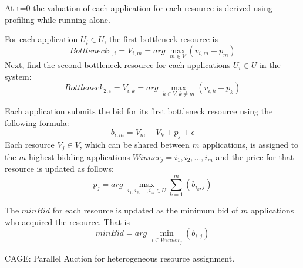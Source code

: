 \begin{comment}
Diffrentiating with respect to $b_1$ the optimal bid for application one is derived as follows:



\begin{equation}
\frac{\partial}{\partial b_1} ( {(\frac{n-m+1}{n-m} b_1) }^{n-m} (v_1 -b_1))=0.
\end{equation}

Which gives us the optimal bid for each application:
\begin{equation}
\Rightarrow b_1= \frac{n-m}{n-m+1}v_1
\end{equation}
\end{proof}
\end{comment}
\begin{algorithm}[!tb]
\DontPrintSemicolon %
At t=0 the valuation of each application for each resource is derived using profiling while running alone. 

For each application $U_i \in U$, the first bottleneck resource is
\[ Bottleneck_{1,i} = V_{i,m}=  arg \; \max_{m \in V} (v_{i,m}-p_{m})  \] 
Next, find the second bottleneck resource for each applications $U_i \in U$ in the system:
\[ Bottleneck_{2,i} = V_{i,k}=  arg \; \max_{k \in V, k \neq m} (v_{i,k}-p_{k})  \] 

Each application submits the bid for its first bottleneck resource using the following formula:
\[ b_{i,m} = V_m - V_k + p_{j} + \epsilon \]
Each resource $V_j \in V$, which can be shared between $m$ applications, is assigned to the $m$ highest bidding applications $Winner_j={i_1, i_2, ..., i_m}$ and the price for that resource is updated as follows:
\[ p_{j} =  arg \; \max_{i_1, i_2, ..., i_m \in U} \sum\limits_{k=1}^m (b_{i_k,j})  \]

The $minBid$ for each resource is updated as the minimum bid of $m$ applications who acquired the resource. That is
\[ minBid=  arg \; \min_{i \in Winner_j}  (b_{i,j}) \] 
 
\caption{CAGE: Parallel Auction for heterogeneous resource assignment.}
\label{algo:b}
\vspace{0\baselineskip}
\end{algorithm}
